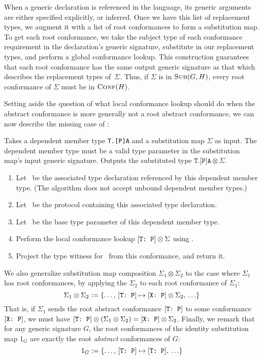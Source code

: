 \documentclass[../generics]{subfiles}
\begin{document}
When a generic declaration is referenced in the language, its generic arguments are either specified explicitly, or inferred. Once we have this list of replacement types, we augment it with a list of root conformances to form a substitution map. To get each root conformance, we take the subject type of each conformance requirement in the declaration's generic signature, substitute in our replacement types, and perform a global conformance lookup. This construction guarantees that each root conformance has the same output generic signature as that which describes the replacement types of~$\Sigma$. Thus, if $\Sigma$ is in $\textsc{Sub}({G, H})$, every root conformance of $\Sigma$ must be in $\textsc{Conf}({H})$.

\pagebreak

Setting aside the question of what local conformance lookup should do when the abstract conformance is more generally not a root abstract conformance, we can now describe the missing case of :
\begin{algorithm}\label{dependent member type substitution}
Takes a dependent member type \texttt{T.[P]A} and a substitution map $\Sigma$ as input. The dependent member type must be a valid type parameter in the substitution map's input generic signature. Outputs the substituted type $\texttt{T.[P]A}\otimes\Sigma$.
\begin{enumerate}
\item Let \nA\ be the associated type declaration referenced by this dependent member type. (The algorithm does not accept unbound dependent member types.)
\item Let \tP\ be the protocol containing this associated type declaration.
\item Let \tT\ be the base type parameter of this dependent member type.
\item Perform the local conformance lookup $[\texttt{T:~P}]\otimes\Sigma$ using .
\item Project the type witness for \nA\ from this conformance, and return it.
\end{enumerate}
\end{algorithm}

We also generalize substitution map composition $\Sigma_1 \otimes \Sigma_2$ to the case where $\Sigma_1$ has root conformances, by applying the $\Sigma_2$ to each root conformance of $\Sigma_1$:
\[ \Sigma_1 \otimes \Sigma_2 := \{\ldots,\, [\texttt{T:~P}] \mapsto [\texttt{X:~P}] \otimes \Sigma_2,\, \ldots\} \]
That is, if $\Sigma_1$ sends the root abstract conformance $[\texttt{T:~P}]$ to some conformance $[\texttt{X:~P}]$, we must have $[\texttt{T:~P}]\otimes(\Sigma_1\otimes\Sigma_2) = [\texttt{X:~P}] \otimes \Sigma_2$.
Finally, we remark that for any generic signature $G$, the root conformances of the identity substitution map $1_G$ are exactly the root \emph{abstract} conformances of $G$:
\[ 1_G := \{\ldots,\, [\texttt{T:~P}] \mapsto [\texttt{T:~P}],\, \ldots\} \]
\end{document}
